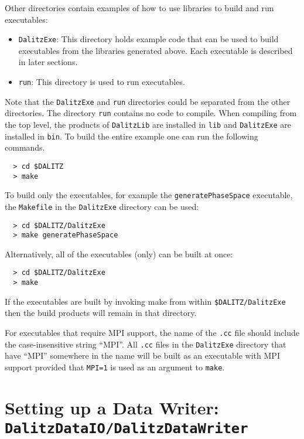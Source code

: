 \documentclass[11pt]{article}
\begin{document}
Other directories contain examples of how to use libraries to build and run executables:
\begin{itemize}
\item {\tt DalitzExe}:  This directory holds example code that can be used to build executables from the libraries generated above.  Each executable is described in later sections.
\item {\tt run}:  This directory is used to run executables.
\end{itemize}

Note that the {\tt DalitzExe} and {\tt run} directories could be separated from the other directories.  The directory {\tt run} contains no code to compile.  When compiling from the top level, the products of {\tt DalitzLib} are installed in {\tt lib} and {\tt DalitzExe} are installed in {\tt bin}.  To build the entire example one can run the following commands.

\begin{verbatim}
  > cd $DALITZ
  > make
\end{verbatim}

To build only the executables, for example the {\tt generatePhaseSpace} executable, the {\tt Makefile} in the {\tt DalitzExe} directory can be used:
\begin{verbatim}
  > cd $DALITZ/DalitzExe
  > make generatePhaseSpace
\end{verbatim}

Alternatively, all of the executables (only) can be built at once:
\begin{verbatim}
  > cd $DALITZ/DalitzExe
  > make
\end{verbatim}

If the executables are built by invoking make from within {\tt \$DALITZ/DalitzExe} then the build products will remain in that directory.

For executables that require MPI support, the name of the {\tt *.cc} file should include the case-insensitive string ``MPI''.  All {\tt *.cc} files in the {\tt DalitzExe} directory that have ``MPI'' somewhere in the name will be built as an executable with MPI support provided that {\tt MPI=1} is used as an argument to {\tt make}.

\section{Setting up a Data Writer: \\ 
{\tt DalitzDataIO/DalitzDataWriter}}
\label{sec:dw}
\end{document}
